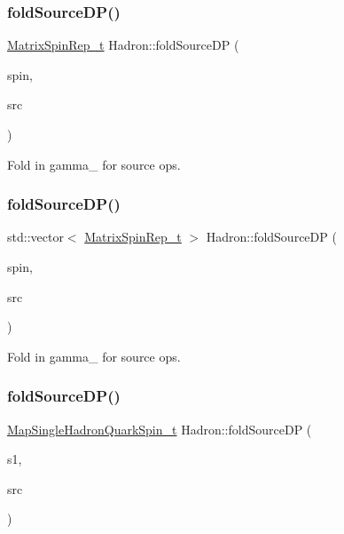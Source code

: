 \subsubsection{\texorpdfstring{foldSourceDP()}{foldSourceDP()}\hspace{0.1cm}{\footnotesize\ttfamily [1/7]}}
{\footnotesize\ttfamily \mbox{\hyperlink{structHadron_1_1MatrixSpinRep__t}{Matrix\+Spin\+Rep\+\_\+t}} Hadron\+::fold\+Source\+DP (\begin{DoxyParamCaption}\item[{const \mbox{\hyperlink{structHadron_1_1MatrixSpinRep__t}{Matrix\+Spin\+Rep\+\_\+t}} \&}]{spin,  }\item[{bool}]{src }\end{DoxyParamCaption})}



Fold in gamma\+\_ for source ops. 

\mbox{\label{namespaceHadron_a26162db6431302c5e52fbd5fafdbedae}} 
\subsubsection{\texorpdfstring{foldSourceDP()}{foldSourceDP()}\hspace{0.1cm}{\footnotesize\ttfamily [2/7]}}
{\footnotesize\ttfamily std\+::vector$<$ \mbox{\hyperlink{structHadron_1_1MatrixSpinRep__t}{Matrix\+Spin\+Rep\+\_\+t}} $>$ Hadron\+::fold\+Source\+DP (\begin{DoxyParamCaption}\item[{const std\+::vector$<$ \mbox{\hyperlink{structHadron_1_1MatrixSpinRep__t}{Matrix\+Spin\+Rep\+\_\+t}} $>$ \&}]{spin,  }\item[{bool}]{src }\end{DoxyParamCaption})}



Fold in gamma\+\_ for source ops. 

\mbox{\label{namespaceHadron_a3ea046027140669df443a45763de3e2c}} 
\subsubsection{\texorpdfstring{foldSourceDP()}{foldSourceDP()}\hspace{0.1cm}{\footnotesize\ttfamily [3/7]}}
{\footnotesize\ttfamily \mbox{\hyperlink{namespaceHadron_a22279e56b59508dc8dd2c8991dc911fd}{Map\+Single\+Hadron\+Quark\+Spin\+\_\+t}} Hadron\+::fold\+Source\+DP (\begin{DoxyParamCaption}\item[{const \mbox{\hyperlink{namespaceHadron_a22279e56b59508dc8dd2c8991dc911fd}{Map\+Single\+Hadron\+Quark\+Spin\+\_\+t}} \&}]{s1,  }\item[{bool}]{src }\end{DoxyParamCaption})}

